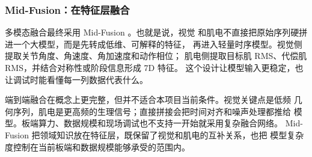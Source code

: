 \subsubsection{Mid-Fusion：在特征层融合}

多模态融合最终采用 Mid-Fusion \cite{baltrusaitis2018}。也就是说，视觉
和肌电不直接把原始序列硬拼进一个大模型，而是先转成低维、可解释的特征，
再进入轻量时序模型。视觉侧提取关节角度、角速度、角加速度和动作相位；
肌电侧提取目标肌 RMS、代偿肌 RMS，并结合对称性或阶段信息形成 7D 特征。
这个设计让模型输入更稳定，也让调试时能看懂每一列数据代表什么。

端到端融合在概念上更完整，但并不适合本项目当前条件。视觉关键点是低频
几何序列，肌电是更高频的生理信号；直接拼接会把时间对齐和噪声处理都推给
模型。板端算力、数据规模和现场调试也不支持一开始就采用复杂融合网络。
Mid-Fusion 把领域知识放在特征层，既保留了视觉和肌电的互补关系，也把
模型复杂度控制在当前板端和数据规模能够承受的范围内。

